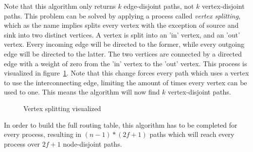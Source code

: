 Note that this algorithm only returns $k$ edge-disjoint paths, not $k$ vertex-disjoint paths. This problem can be solved by applying a process called \textit{vertex splitting}, which as the name implies splits every vertex with the exception of source and sink into two distinct vertices. 
A vertex is split into an 'in' vertex, and an 'out' vertex. Every incoming edge will be directed to the former, while every outgoing edge will be directed to the latter. The two vertices are connected by a directed edge with a weight of zero from the 'in' vertex to the 'out' vertex. This process is visualized in figure~\ref{contr:node-splitting}. Note that this change forces every path which uses a vertex to use the interconnecting edge, limiting the amount of times every vertex can be used to one. This means the algorithm will now find $k$ vertex-disjoint paths.

\begin{figure}[h]
    \centering
    \caption{Vertex splitting visualized}
    \label{contr:node-splitting}
\end{figure}

In order to build the full routing table, this algorithm has to be completed for every process, resulting in $(n-1) * (2f+1)$ paths which will reach every process over $2f+1$ node-disjoint paths.

